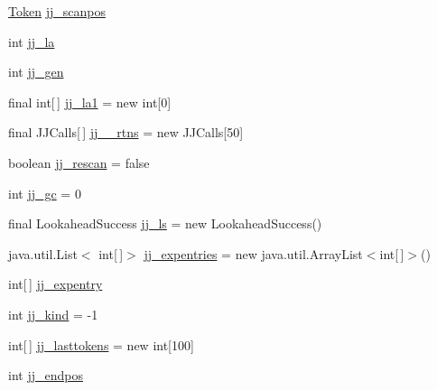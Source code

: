 \begin{DoxyCompactItemize}
\item 
\hyperlink{classuk_1_1ac_1_1manchester_1_1cs_1_1owlapi_1_1dlsyntax_1_1parser_1_1_token}{Token} \hyperlink{classuk_1_1ac_1_1manchester_1_1cs_1_1owlapi_1_1dlsyntax_1_1parser_1_1_d_l_syntax_parser_a138489ef64e1a6e9071940cdacdb1b71}{jj\-\_\-scanpos}
\item 
int \hyperlink{classuk_1_1ac_1_1manchester_1_1cs_1_1owlapi_1_1dlsyntax_1_1parser_1_1_d_l_syntax_parser_a0500e2a36ecf8e77670534fc82021b76}{jj\-\_\-la}
\item 
int \hyperlink{classuk_1_1ac_1_1manchester_1_1cs_1_1owlapi_1_1dlsyntax_1_1parser_1_1_d_l_syntax_parser_a1a6a1925c3b7fd6b7c339651769924da}{jj\-\_\-gen}
\item 
final int\mbox{[}$\,$\mbox{]} \hyperlink{classuk_1_1ac_1_1manchester_1_1cs_1_1owlapi_1_1dlsyntax_1_1parser_1_1_d_l_syntax_parser_a823c0e7abf400cc26da55b9893cb79f0}{jj\-\_\-la1} = new int\mbox{[}0\mbox{]}
\item 
final J\-J\-Calls\mbox{[}$\,$\mbox{]} \hyperlink{classuk_1_1ac_1_1manchester_1_1cs_1_1owlapi_1_1dlsyntax_1_1parser_1_1_d_l_syntax_parser_ac9624d6e2d28f34237c032c8ad583e73}{jj\-\_\-\_\-rtns} = new J\-J\-Calls\mbox{[}50\mbox{]}
\item 
boolean \hyperlink{classuk_1_1ac_1_1manchester_1_1cs_1_1owlapi_1_1dlsyntax_1_1parser_1_1_d_l_syntax_parser_a5c96bb70751aeb24a864264171103213}{jj\-\_\-rescan} = false
\item 
int \hyperlink{classuk_1_1ac_1_1manchester_1_1cs_1_1owlapi_1_1dlsyntax_1_1parser_1_1_d_l_syntax_parser_a3b0eac0b48f5bfc71ec48f31fc27954a}{jj\-\_\-gc} = 0
\item 
final Lookahead\-Success \hyperlink{classuk_1_1ac_1_1manchester_1_1cs_1_1owlapi_1_1dlsyntax_1_1parser_1_1_d_l_syntax_parser_acd02d44eeb149e57046a24f9f158e88a}{jj\-\_\-ls} = new Lookahead\-Success()
\item 
java.\-util.\-List$<$ int\mbox{[}$\,$\mbox{]}$>$ \hyperlink{classuk_1_1ac_1_1manchester_1_1cs_1_1owlapi_1_1dlsyntax_1_1parser_1_1_d_l_syntax_parser_a1890ccbefbf952784fca49e2ac3c15e7}{jj\-\_\-expentries} = new java.\-util.\-Array\-List$<$int\mbox{[}$\,$\mbox{]}$>$()
\item 
int\mbox{[}$\,$\mbox{]} \hyperlink{classuk_1_1ac_1_1manchester_1_1cs_1_1owlapi_1_1dlsyntax_1_1parser_1_1_d_l_syntax_parser_ac4b71c31f93c73fbc7715afdaacbd499}{jj\-\_\-expentry}
\item 
int \hyperlink{classuk_1_1ac_1_1manchester_1_1cs_1_1owlapi_1_1dlsyntax_1_1parser_1_1_d_l_syntax_parser_ad3210a200f4bc157aadf95a2301ecca4}{jj\-\_\-kind} = -\/1
\item 
int\mbox{[}$\,$\mbox{]} \hyperlink{classuk_1_1ac_1_1manchester_1_1cs_1_1owlapi_1_1dlsyntax_1_1parser_1_1_d_l_syntax_parser_a4406b257cc482e508287afa5a0673a3d}{jj\-\_\-lasttokens} = new int\mbox{[}100\mbox{]}
\item 
int \hyperlink{classuk_1_1ac_1_1manchester_1_1cs_1_1owlapi_1_1dlsyntax_1_1parser_1_1_d_l_syntax_parser_a239f2ec2852277fb3ebba379c109e8d5}{jj\-\_\-endpos}
\end{DoxyCompactItemize}
